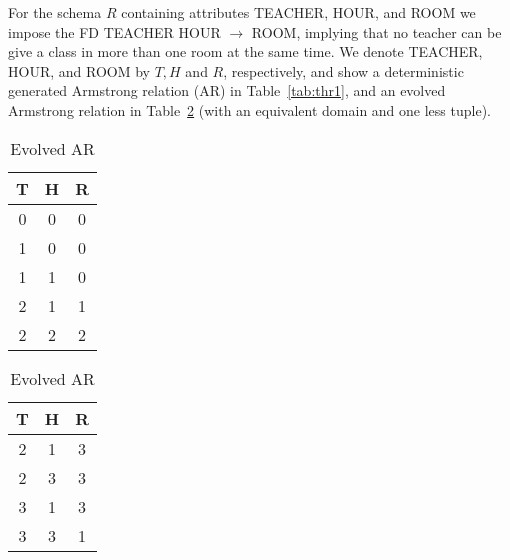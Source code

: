 \begin{example}
\begin{rm}
For the schema $R$ containing attributes TEACHER, HOUR, and ROOM
we impose the FD TEACHER HOUR $\to$ ROOM, implying that no teacher
can be give a class in more than one room at the same time.
 We denote TEACHER, HOUR, and ROOM by $T, H$ and $R$,
 respectively, and show a deterministic
generated Armstrong relation (AR) in Table~\ref{tab:thr1}, and an evolved 
Armstrong relation in Table~\ref{tab:thr2} (with an equivalent domain and one
less tuple).
\end{rm}
\end{example}

{\line
\begin{table}[ht]
\begin{minipage}[b]{8cm}
\begin{center}
\begin{tabular}{|c|c|c|} \hline
 T & H & R \\ \hline
 0 & 0 & 0 \\
 1 & 0 & 0 \\
 1 & 1 & 0 \\
 2 & 1 & 1 \\
 2 & 2 & 2 \\  \hline
\end{tabular}
\end{center}
\caption{\label{tab:thr1}Deterministic AR}
\end{minipage}
\hfill
\begin{minipage}[b]{8cm}
\begin{center}
\begin{tabular}{|c|c|c|} \hline
 T & H & R \\ \hline
 2 & 1 & 3 \\
 2 & 3 & 3 \\
 3 & 1 & 3 \\
 3 & 3 & 1 \\  \hline
\end{tabular}
\end{center}
\caption{\label{tab:thr2} Evolved AR}
\end{minipage}
\end{table}

}

